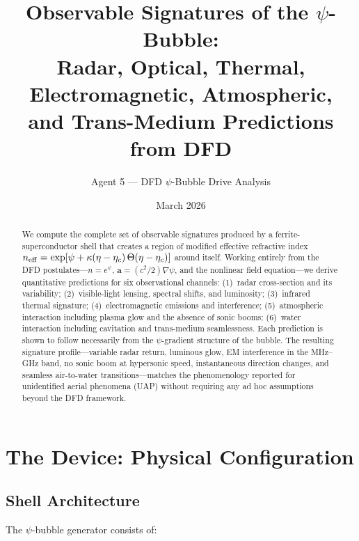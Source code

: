 \documentclass[11pt]{article}
\title{Observable Signatures of the $\psi$-Bubble:\\
Radar, Optical, Thermal, Electromagnetic, Atmospheric,\\
and Trans-Medium Predictions from DFD}
\author{Agent 5 --- DFD $\psi$-Bubble Drive Analysis}
\date{March 2026}
\newcommand{\etac}{\eta_c}
\newcommand{\neff}{n_{\rm eff}}
\begin{document}
\maketitle

\begin{abstract}
We compute the complete set of observable signatures produced by a
ferrite-superconductor shell that creates a region of modified effective
refractive index $\neff = \exp[\psi + \kappa(\eta - \etac)\,\Theta(\eta - \etac)]$
around itself. Working entirely from the DFD postulates---$n = e^\psi$,
$\mathbf{a} = (c^2/2)\nabla\psi$, and the nonlinear field equation---we
derive quantitative predictions for six observational channels:
(1)~radar cross-section and its variability;
(2)~visible-light lensing, spectral shifts, and luminosity;
(3)~infrared thermal signature;
(4)~electromagnetic emissions and interference;
(5)~atmospheric interaction including plasma glow and the absence of sonic booms;
(6)~water interaction including cavitation and trans-medium seamlessness.
Each prediction is shown to follow necessarily from the $\psi$-gradient
structure of the bubble. The resulting signature profile---variable radar
return, luminous glow, EM interference in the MHz--GHz band, no sonic boom
at hypersonic speed, instantaneous direction changes, and seamless
air-to-water transitions---matches the phenomenology reported for
unidentified aerial phenomena (UAP) without requiring any ad hoc assumptions
beyond the DFD framework.
\end{abstract}

\tableofcontents

\section{The Device: Physical Configuration}\label{sec:device}

\subsection{Shell Architecture}

The $\psi$-bubble generator consists of:
\end{document}
